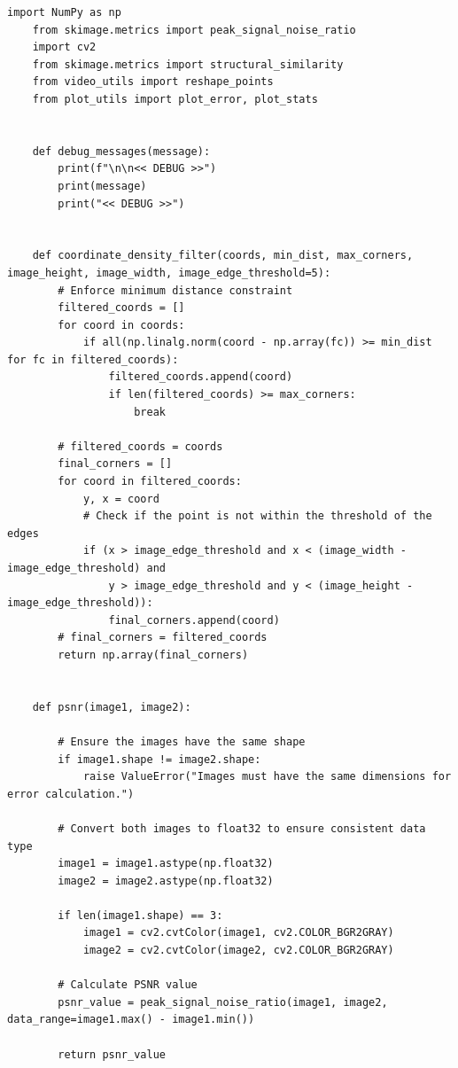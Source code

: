 \documentclass[11pt, conference, letterpaper]{IEEEtran}
\begin{document}
\begin{lstlisting}[style=python, caption={\texttt{utils.py}}, label={lst:utils}]
    import NumPy as np
    from skimage.metrics import peak_signal_noise_ratio
    import cv2
    from skimage.metrics import structural_similarity
    from video_utils import reshape_points
    from plot_utils import plot_error, plot_stats
    
    
    def debug_messages(message):
        print(f"\n\n<< DEBUG >>")
        print(message)
        print("<< DEBUG >>")
        
        
    def coordinate_density_filter(coords, min_dist, max_corners, image_height, image_width, image_edge_threshold=5):
        # Enforce minimum distance constraint
        filtered_coords = []
        for coord in coords:
            if all(np.linalg.norm(coord - np.array(fc)) >= min_dist for fc in filtered_coords):
                filtered_coords.append(coord)
                if len(filtered_coords) >= max_corners:
                    break
        
        # filtered_coords = coords
        final_corners = []    
        for coord in filtered_coords:
            y, x = coord
            # Check if the point is not within the threshold of the edges
            if (x > image_edge_threshold and x < (image_width - image_edge_threshold) and
                y > image_edge_threshold and y < (image_height - image_edge_threshold)):
                final_corners.append(coord)
        # final_corners = filtered_coords
        return np.array(final_corners)
    
    
    def psnr(image1, image2):
       
        # Ensure the images have the same shape
        if image1.shape != image2.shape:
            raise ValueError("Images must have the same dimensions for error calculation.")
    
        # Convert both images to float32 to ensure consistent data type
        image1 = image1.astype(np.float32)
        image2 = image2.astype(np.float32)
        
        if len(image1.shape) == 3:
            image1 = cv2.cvtColor(image1, cv2.COLOR_BGR2GRAY)
            image2 = cv2.cvtColor(image2, cv2.COLOR_BGR2GRAY)
        
        # Calculate PSNR value
        psnr_value = peak_signal_noise_ratio(image1, image2, data_range=image1.max() - image1.min())
    
        return psnr_value
    

\end{lstlisting}
\end{document}

